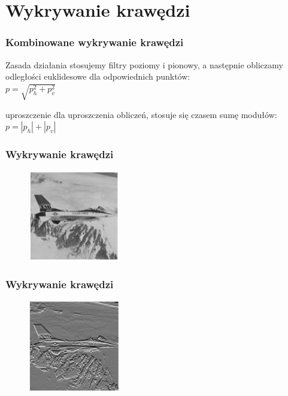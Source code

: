 \documentclass{beamer}
\begin{document}
\section{Wykrywanie krawędzi}
\begin{frame}
\frametitle{Kombinowane wykrywanie krawędzi}
\begin{block}{Zasada działania}
stosujemy filtry poziomy i pionowy, a następnie obliczamy odległości euklidesowe dla odpowiednich punktów:\\
$p = \sqrt{p_h^2 + p_v^2}$
\end{block}
\begin{block}{uproszczenie}
dla uproszczenia obliczeń, stosuje się czasem sumę modułów:\\
$p = |p_h| + |p_v|$
\end{block}
\end{frame}
\begin{frame}
\frametitle{Wykrywanie krawędzi}
\begin{figure}
\includegraphics[height=150px]{krawedzie_orig}
\end{figure}
\end{frame}
\begin{frame}
\frametitle{Wykrywanie krawędzi}
\begin{figure}
\hspace{-200px}
\includegraphics[width=150px]{krawedzie_poziome}
\end{figure}
\begin{figure}
\end{figure}
\end{frame}
\end{document}

